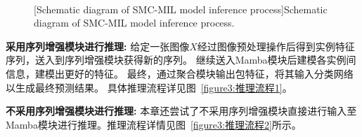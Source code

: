 \begin{figure}[h]
  \centering
  \\
  [Schematic diagram of SMC-MIL model inference process]{Schematic diagram of SMC-MIL model inference process.}
  \label{figure3: 推理流程}
\end{figure}

\textbf{采用序列增强模块进行推理:} 给定一张图像$X$经过图像预处理操作后得到实例特征序列，送入到序列增强模块获得新的序列。
继续送入Mamba模块后建模各实例间信息，建模出更好的特征。
最终，通过聚合模块输出包特征，将其输入分类网络以生成最终预测结果。
具体推理流程详见图~\ref{figure3:推理流程1}。

\textbf{不采用序列增强模块进行推理:} 本章还尝试了不采用序列增强模块直接进行输入至Mamba模块进行推理。推理流程详情见图~\ref{figure3:推理流程2}所示。

